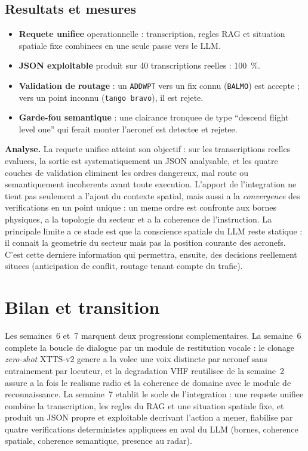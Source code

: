 \documentclass[11pt,a4paper]{article}
\begin{document}
\subsection{Resultats et mesures}

\begin{resbox}
\begin{itemize}
  \item \textbf{Requete unifiee} operationnelle : transcription, regles RAG et
  situation spatiale fixe combinees en une seule passe vers le LLM.
  \item \textbf{JSON exploitable} produit sur 40 transcriptions reelles : 100~\%.
  \item \textbf{Validation de routage} : un \texttt{ADDWPT} vers un fix connu
  (\texttt{BALMO}) est accepte ; vers un point inconnu (\texttt{tango bravo}), il est
  rejete.
  \item \textbf{Garde-fou semantique} : une clairance tronquee de type ``descend flight
  level one'' qui ferait monter l'aeronef est detectee et rejetee.
\end{itemize}
\end{resbox}

\noindent\textbf{Analyse.} La requete unifiee atteint son objectif : sur les
transcriptions reelles evaluees, la sortie est systematiquement un JSON analysable, et
les quatre couches de validation eliminent les ordres dangereux, mal route ou
semantiquement incoherents avant toute execution. L'apport de l'integration ne tient
pas seulement a l'ajout du contexte spatial, mais aussi a la \emph{convergence} des
verifications en un point unique : un meme ordre est confronte aux bornes physiques, a
la topologie du secteur et a la coherence de l'instruction. La principale limite a ce
stade est que la conscience spatiale du LLM reste statique : il connait la geometrie du
secteur mais pas la position courante des aeronefs. C'est cette derniere information qui
permettra, ensuite, des decisions reellement situees (anticipation de conflit, routage
tenant compte du trafic).

\section{Bilan et transition}

Les semaines~6 et~7 marquent deux progressions complementaires. La semaine~6 complete
la boucle de dialogue par un module de restitution vocale : le clonage \emph{zero-shot}
XTTS-v2 genere a la volee une voix distincte par aeronef sans entrainement par
locuteur, et la degradation VHF reutilisee de la semaine~2 assure a la fois le realisme
radio et la coherence de domaine avec le module de reconnaissance. La semaine~7 etablit
le socle de l'integration : une requete unifiee combine la transcription, les regles du
RAG et une situation spatiale fixe, et produit un JSON propre et exploitable decrivant
l'action a mener, fiabilise par quatre verifications deterministes appliquees en aval du
LLM (bornes, coherence spatiale, coherence semantique, presence au radar).
\end{document}
